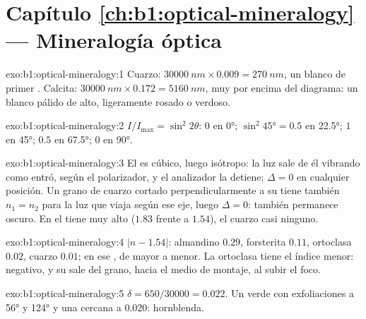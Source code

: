 \section*{Capítulo \ref{ch:b1:optical-mineralogy} --- Mineralogía óptica}

\begin{solution}{exo:b1:optical-mineralogy:1}
Cuarzo: $\qty{30000}{nm}\times0.009 = \qty{270}{nm}$, un blanco de primer . Calcita:
$\qty{30000}{nm}\times0.172 = \qty{5160}{nm}$, muy por encima del diagrama: un blanco pálido de  alto,
ligeramente rosado o verdoso.
\end{solution}

\begin{solution}{exo:b1:optical-mineralogy:2}
$I/I_{\max} = \sin^2 2\theta$: $0$ en \ang{0}; $\sin^2\ang{45} = 0.5$ en \ang{22.5}; $1$ en \ang{45}; $0.5$ en
\ang{67.5}; $0$ en \ang{90}.
\end{solution}

\begin{solution}{exo:b1:optical-mineralogy:3}
El  es cúbico, luego isótropo: la luz sale de él vibrando como entró, según el polarizador, y el analizador la
detiene; $\Delta = 0$ en cualquier posición. Un grano de cuarzo cortado perpendicularmente a su  tiene también
$n_1 = n_2$ para la luz que viaja según ese eje, luego $\Delta = 0$: también permanece oscuro. En  el
 tiene  muy alto ($1.83$ frente a $1.54$), el cuarzo casi ninguno.
\end{solution}

\begin{solution}{exo:b1:optical-mineralogy:4}
$|n - 1.54|$: almandino $0.29$, forsterita $0.11$, ortoclasa $0.02$, cuarzo $0.01$;  en ese , de mayor a menor.
La ortoclasa tiene el índice menor:  negativo, y su  sale del grano, hacia el medio de montaje, al
subir el foco.
\end{solution}

\begin{solution}{exo:b1:optical-mineralogy:5}
$\delta = 650/30000 = 0.022$. Un  verde  con exfoliaciones a \ang{56} y \ang{124} y una 
cercana a $0.020$: hornblenda.
\end{solution}

